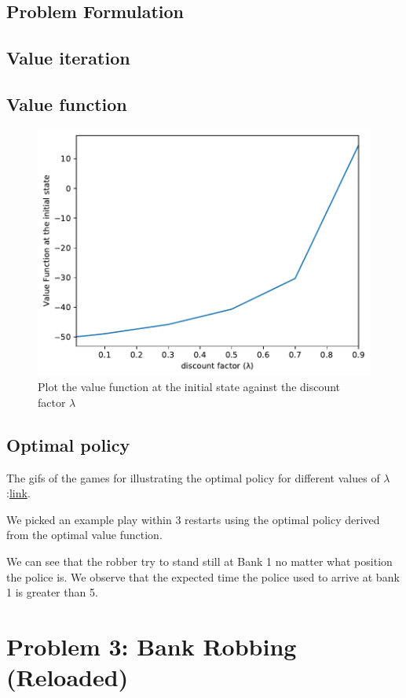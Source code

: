 \documentclass{article}
\begin{document}
\subsection{Problem Formulation}
\subsection{Value iteration}
\subsection{Value function}

\begin{figure}[H]
  \centering
  \includegraphics[width=.9\linewidth]{prob2_vfunc.pdf}
  \caption{Plot the value function at the initial state against the discount factor $\lambda$}
\end{figure}

\subsection{Optimal policy}
The gifs of the games for illustrating the optimal policy for different values of $\lambda$
:\href{https://mega.nz/#F!ojJATAAK!KvsQXmRofJkyiYI9tlqWtA}{link}.

We picked an example play within 3 restarts using the optimal policy
derived from the optimal value function.


We can see that the robber try to stand still at Bank 1 no matter what position
the police is. We observe that the expected time the police used to arrive at
bank 1 is greater than 5.


\section{Problem 3: Bank Robbing (Reloaded)}
\end{document}
